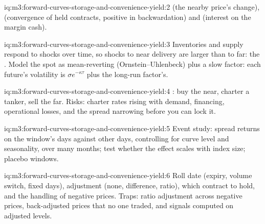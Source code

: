 \begin{solution}{iq:m3:forward-curves-storage-and-convenience-yield:2}
 (the nearby price's change),  (convergence of held contracts, positive in
backwardation) and  (interest on the margin cash).
\end{solution}

\begin{solution}{iq:m3:forward-curves-storage-and-convenience-yield:3}
Inventories and supply respond to shocks over time, so shocks to near delivery are larger than to far:
the . Model the spot as mean-reverting (Ornstein--Uhlenbeck) plus a slow factor: each
future's volatility is $\sigma e^{-\kappa\tau}$ plus the long-run factor's.
\end{solution}

\begin{solution}{iq:m3:forward-curves-storage-and-convenience-yield:4}
: buy the near, charter a tanker, sell the far. Risks: charter rates rising with demand,
financing, operational losses, and the spread narrowing before you can lock it.
\end{solution}

\begin{solution}{iq:m3:forward-curves-storage-and-convenience-yield:5}
Event study: spread returns on the window's days against other days, controlling for curve level and
seasonality, over many months; test whether the effect scales with index size; placebo windows.
\end{solution}

\begin{solution}{iq:m3:forward-curves-storage-and-convenience-yield:6}
Roll date (expiry, volume switch, fixed days), adjustment (none, difference, ratio), which contract to
hold, and the handling of negative prices. Traps: ratio adjustment across negative prices, back-adjusted
prices that no one traded, and signals computed on adjusted levels.
\end{solution}
